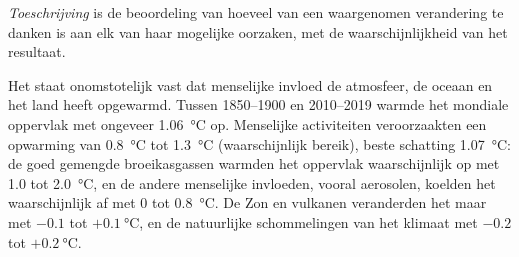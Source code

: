 \begin{definition}[Toeschrijving]\label{def:g12:climate-change:attribution}
\emph{Toeschrijving} is de beoordeling van hoeveel van een
waargenomen verandering te danken is aan elk van haar mogelijke oorzaken, met de waarschijnlijkheid
van het resultaat.
\end{definition}

\begin{proposition}\label{prop:g12:climate-change:attribution}
Het staat onomstotelijk vast dat menselijke invloed de atmosfeer, de oceaan
en het land heeft opgewarmd. Tussen 1850--1900 en 2010--2019 warmde het mondiale oppervlak
met ongeveer \qty{1.06}{\degreeCelsius} op. Menselijke activiteiten veroorzaakten een opwarming van
\qty{0.8}{\degreeCelsius} tot \qty{1.3}{\degreeCelsius} (waarschijnlijk bereik), beste
schatting \qty{1.07}{\degreeCelsius}: de goed gemengde broeikasgassen warmden het
oppervlak waarschijnlijk op met 1.0 tot \qty{2.0}{\degreeCelsius}, en de andere menselijke
invloeden, vooral aerosolen, koelden het waarschijnlijk af met 0 tot
\qty{0.8}{\degreeCelsius}. De Zon en vulkanen veranderden het maar met $-0.1$
tot $+\qty{0.1}{\degreeCelsius}$, en de natuurlijke schommelingen van het klimaat
met $-0.2$ tot $+\qty{0.2}{\degreeCelsius}$.
\end{proposition}

